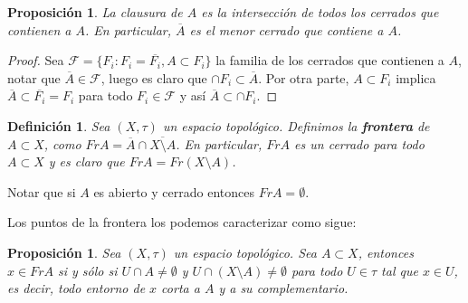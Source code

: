 \documentclass[12pt]{article}
\newtheorem{proposition}[theorem]{Proposición}
\newtheorem{definition}[theorem]{Definición}
\begin{document}
\begin{proposition}La clausura de $A$ es la intersección de todos los cerrados que contienen a $A$. En particular, $\overline{A}$ es el menor cerrado que contiene a $A$.
\end{proposition}
\begin{proof}
Sea $\mathcal{F} = \lbrace F_i : F_i = \overline{F_i}, A \subset F_i \rbrace$ la familia de los cerrados que contienen a $A$, notar que $\overline{A} \in \mathcal{F}$, luego es claro que $\cap F_i  \subset \overline{A}$. Por otra parte, $A \subset F_i$ implica $\overline{A} \subset \overline{F_i} = F_i$ para todo $F_i \in \mathcal{F}$ y así $\overline{A} \subset \cap F_i$.

\end{proof}

\begin{definition}Sea $(X, \tau)$ un espacio topológico. Definimos la \textbf{frontera} de $A \subset X$, como $Fr A = \overline{A} \cap \overline{X\setminus A}$. En particular, $FrA$ es un cerrado para todo $A \subset X$ y es claro que $FrA = Fr(X\setminus A)$.
\end{definition}

Notar que si $A$ es abierto y cerrado entonces $Fr A = \emptyset$.

Los puntos de la frontera los podemos caracterizar como sigue:

\begin{proposition}Sea $(X, \tau)$ un espacio topológico. Sea $A \subset X$, entonces $x \in Fr A$ si y sólo si $U \cap A \neq \emptyset$ y $U \cap (X \setminus A) \neq \emptyset$ para todo $U\in \tau$ tal que $x \in U$, es decir, todo entorno de $x$ corta a $A$ y a su complementario.
\end{proposition}
\end{document}
